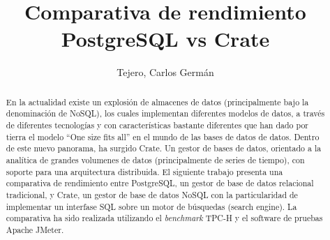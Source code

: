 \documentclass[11pt, twocolumns]{article}
\title{Comparativa de rendimiento PostgreSQL vs Crate}
\author{Tejero, Carlos Germán}
\begin{document}
\maketitle

\begin{abstract}
En la actualidad existe un explosión de almacenes de datos (principalmente bajo la denominación de NoSQL), los cuales implementan diferentes modelos de datos, a través de diferentes tecnologías y con características bastante diferentes que han dado por tierra el modelo ``One size fits all'' en el mundo de las bases de datos de datos. Dentro de este nuevo panorama, ha surgido Crate. Un gestor de bases de datos, orientado a la analítica de grandes volumenes de datos (principalmente de series de tiempo), con soporte para una arquitectura distribuida.
El siguiente trabajo presenta una comparativa de rendimiento entre PostgreSQL\cite{postgresql}, un gestor de base de datos relacional tradicional, y Crate\cite{crate}, un gestor de base de datos NoSQL con la particularidad de implementar un interfase SQL sobre un motor de búsquedas (search engine).
La comparativa ha sido realizada utilizando el \textit{benchmark} TPC-H\cite{tpc2018benchmark} y el software de pruebas Apache JMeter\cite{jmeter}.
\end{abstract}
\end{document}
